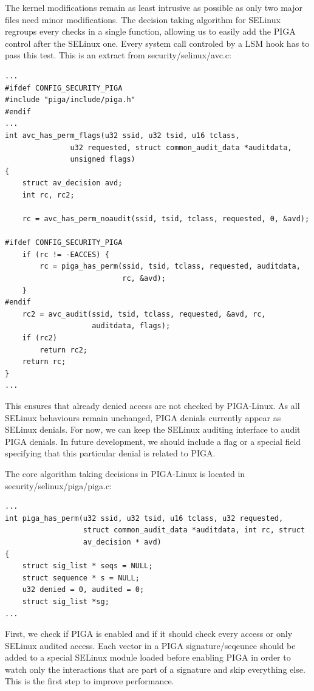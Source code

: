 \documentclass[pdftex,a4paper,titlepage,11pt]{article}
\begin{document}
\bigskip

The kernel modifications remain as least intrusive as possible as only two major
files need minor modifications. The decision taking algorithm for SELinux
regroups every checks in a single function, allowing us to easily add the PIGA
control after the SELinux one. Every system call controled by a LSM hook has
to pass this test. This is an extract from security/selinux/avc.c:

\begin{lstlisting}
...
#ifdef CONFIG_SECURITY_PIGA
#include "piga/include/piga.h"
#endif
...
int avc_has_perm_flags(u32 ssid, u32 tsid, u16 tclass,
		       u32 requested, struct common_audit_data *auditdata,
		       unsigned flags)
{
	struct av_decision avd;
	int rc, rc2;

	rc = avc_has_perm_noaudit(ssid, tsid, tclass, requested, 0, &avd);

#ifdef CONFIG_SECURITY_PIGA
	if (rc != -EACCES) {
		rc = piga_has_perm(ssid, tsid, tclass, requested, auditdata,
						   rc, &avd);
	}
#endif
	rc2 = avc_audit(ssid, tsid, tclass, requested, &avd, rc,
					auditdata, flags);
	if (rc2)
		return rc2;
	return rc;
}
...
\end{lstlisting}

\medskip

This ensures that already denied access are not checked by PIGA-Linux. As all
SELinux behaviours remain unchanged, PIGA denials currently appear as SELinux
denials. For now, we can keep the SELinux auditing interface to audit PIGA
denials. In future development, we should include a flag or a special field
specifying that this particular denial is related to PIGA.

\bigskip

The core algorithm taking decisions in PIGA-Linux is located in
security/selinux/piga/piga.c:

\begin{lstlisting}
...
int piga_has_perm(u32 ssid, u32 tsid, u16 tclass, u32 requested,
				  struct common_audit_data *auditdata, int rc, struct
				  av_decision * avd)
{
	struct sig_list * seqs = NULL;
	struct sequence * s = NULL;
	u32 denied = 0, audited = 0;
	struct sig_list *sg;
...
\end{lstlisting}

\medskip

First, we check if PIGA is enabled and if it should check every access or
only SELinux audited access. Each vector in a PIGA signature/seqeunce should be
added to a special SELinux module loaded before enabling PIGA in order to watch
only the interactions that are part of a signature and skip everything else.
This is the first step to improve performance.
\end{document}
